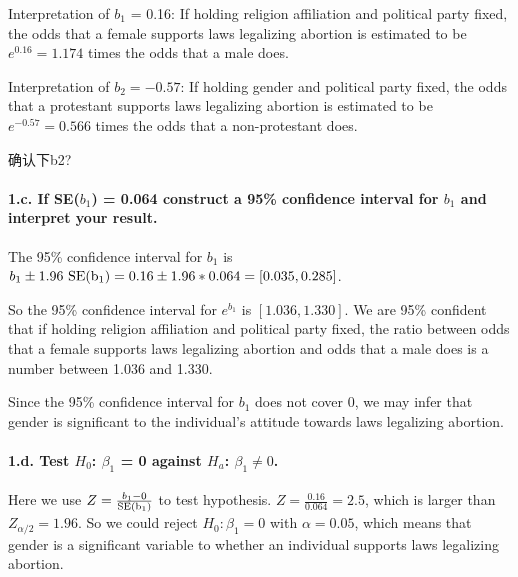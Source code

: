 \documentclass[]{article}
\let\oldparagraph\paragraph
\renewcommand{\paragraph}[1]{\oldparagraph{#1}\mbox{}}
\begin{document}
Interpretation of \(b_1\) = 0.16: If holding religion affiliation and
political party fixed, the odds that a female supports laws legalizing
abortion is estimated to be \(e^{0.16} = 1.174\) times the odds that a
male does.

Interpretation of \(b_2 = -0.57\): If holding gender and political party
fixed, the odds that a protestant supports laws legalizing abortion is
estimated to be \(e^{-0.57} = 0.566\) times the odds that a
non-protestant does.

{确认下b2?}

\hypertarget{c.-if-seb_1-0.064-construct-a-95-confidence-interval-for-b_1-and-interpret-your-result.}{%
\paragraph{\texorpdfstring{1.c. If SE(\(b_1\)) = 0.064 construct a 95\%
confidence interval for \(b_1\) and interpret your
result.}{1.c. If SE(b\_1) = 0.064 construct a 95\% confidence interval for b\_1 and interpret your result.}}\label{c.-if-seb_1-0.064-construct-a-95-confidence-interval-for-b_1-and-interpret-your-result.}}

The 95\% confidence interval for \(b_1\) is
\(b_1 \pm 1.96\ \rm{SE}(b_1) = 0.16 \pm 1.96*0.064 = [0.035, 0.285]\).

So the 95\% confidence interval for \(e^{b_1}\) is \([1.036, 1.330]\).
We are 95\% confident that if holding religion affiliation and political
party fixed, the ratio between odds that a female supports laws
legalizing abortion and odds that a male does is a number between 1.036
and 1.330.

Since the 95\% confidence interval for \(b_1\) does not cover 0, we may
infer that gender is significant to the individual's attitude towards
laws legalizing abortion.

\hypertarget{d.-test-h_0-beta_1-0-against-h_a-beta_1-neq-0.}{%
\paragraph{\texorpdfstring{1.d. Test \(H_0\): \(\beta_1\) = 0 against
\(H_a\):
\(\beta_1 \neq 0\).}{1.d. Test H\_0: \textbackslash{}beta\_1 = 0 against H\_a: \textbackslash{}beta\_1 \textbackslash{}neq 0.}}\label{d.-test-h_0-beta_1-0-against-h_a-beta_1-neq-0.}}

Here we use \(Z = \frac{b_1 - 0}{\rm{SE}(b_1)}\) to test hypothesis.
\(Z = \frac{0.16}{0.064} = 2.5\), which is larger than
\(Z_{\alpha/2} = 1.96\). So we could reject \(H_0: \beta_1 = 0\) with
\(\alpha = 0.05\), which means that gender is a significant variable to
whether an individual supports laws legalizing abortion.
\end{document}
